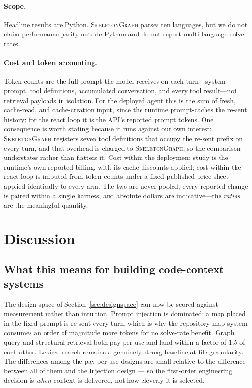 \documentclass[11pt,letterpaper]{article}
\newcommand{\sg}{\textsc{SkeletonGraph}}
\begin{document}
\paragraph{Scope.}
Headline results are Python. \sg{} parses ten languages, but we do not claim
performance parity outside Python and do not report multi-language solve rates.

\paragraph{Cost and token accounting.}
Token counts are the full prompt the model receives on each turn---system prompt,
tool definitions, accumulated conversation, and every tool result---not retrieval
payloads in isolation. For the deployed agent this is the sum of fresh, cache-read,
and cache-creation input, since the runtime prompt-caches the re-sent history; for
the react loop it is the API's reported prompt tokens. One consequence is worth
stating because it runs against our own interest: \sg{} registers seven tool
definitions that occupy the re-sent prefix on every turn, and that overhead is
charged to \sg{}, so the comparison understates rather than flatters it. Cost within
the deployment study is the runtime's own reported billing, with its cache discounts
applied; cost within the react loop is imputed from token counts under a fixed
published price sheet applied identically to every arm. The two are never pooled,
every reported change is paired within a single harness, and absolute dollars are
indicative---the \emph{ratios} are the meaningful quantity.

\section{Discussion}

\subsection{What this means for building code-context systems}
The design space of Section~\ref{sec:designspace} can now be scored against
measurement rather than intuition. Prompt injection is dominated: a map placed in
the fixed prompt is re-sent every turn, which is why the repository-map system
consumes an order of magnitude more tokens for no solve-rate benefit. Graph query
and structural retrieval both pay per use and land within a factor of 1.5 of each
other. Lexical search remains a genuinely strong baseline at file granularity.
The differences among the pay-per-use designs are small relative to the
difference between all of them and the injection design --- so the first-order
engineering decision is \emph{when} context is delivered, not how cleverly it is
selected.
\end{document}
